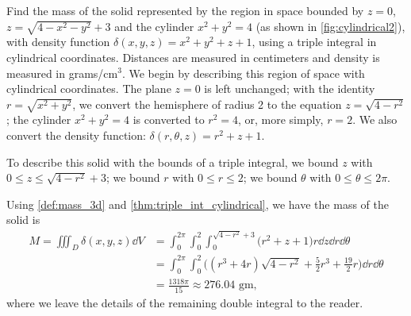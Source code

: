 \begin{example}\label{ex_cylindrical2}%
Find the mass of the solid represented by the region in space bounded by $z=0$, $z=\sqrt{4-x^2-y^2}+3$ and the cylinder $x^2+y^2=4$ (as shown in \autoref{fig:cylindrical2}), with density function $\delta(x,y,z) = x^2+y^2+z+1$, using a triple integral in cylindrical coordinates. Distances are measured in centimeters and density is measured in grams/cm$^3$.
\solution
We begin by describing this region of space with cylindrical coordinates. The plane $z=0$ is left unchanged; with the identity $r=\sqrt{x^2+y^2}$, we convert the hemisphere of radius 2 to the equation $z=\sqrt{4-r^2}$; the cylinder $x^2+y^2=4$ is converted to $r^2=4$, or, more simply, $r=2$.  We also convert the density function: $\delta(r,\theta,z) = r^2+z+1$.

To describe this solid with the bounds of a triple integral, we bound $z$ with $0\leq z\leq \sqrt{4-r^2}+3$; we bound $r$ with $0 \leq r \leq 2$; we bound $\theta$ with $0 \leq \theta \leq 2\pi$.

Using \autoref{def:mass_3d} and \autoref{thm:triple_int_cylindrical}, we have the mass of the solid is
\begin{align*}
M=\iiint_D\delta(x,y,z)\dd V &= \int_0^{2\pi}\int_0^2\int_0^{\sqrt{4-r^2}+3}\bigl(r^2+z+1\bigr)r\dd z\dd r\dd\theta \\
&= \int_0^{2\pi}\int_0^2\bigl((r^3+4r)\sqrt{4-r^2}+\frac52r^3+\frac{19}2r\bigr)\dd r\dd\theta \\
&= \frac{1318\pi}{15} \approx 276.04\text{ gm},
\end{align*}
where we leave the details of the remaining double integral to the reader.
\end{example}

